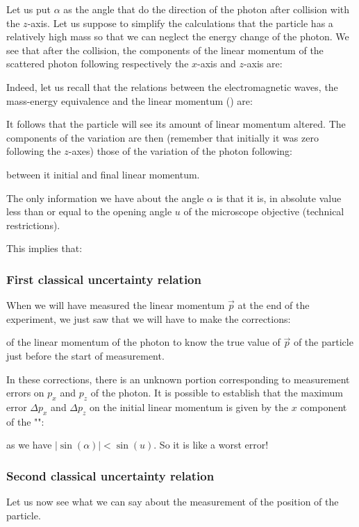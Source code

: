 	Let us put $\alpha$ as the angle that do the direction of the photon after collision with the $z$-axis. Let us suppose to simplify the calculations that the particle has a relatively high mass so that we can neglect the energy change of the photon. We see that after the collision, the components of the linear momentum of the scattered photon following respectively the $x$-axis and $z$-axis are:
	
	Indeed, let us recall that the relations between the electromagnetic waves, the mass-energy equivalence and the linear momentum () are:
	
	It follows that the particle will see its amount of linear momentum altered. The components of the variation are then (remember that initially it was zero following the $z$-axes) those of the variation of the photon following:
	
	between it initial and final linear momentum.

	The only information we have about the angle $\alpha$ is that it is, in absolute value less than or equal to the opening angle $u$ of the microscope objective (technical restrictions).

	This implies that:
	
	
	\subsubsection{First classical uncertainty relation}
	When we will have measured the linear momentum $\vec{p}$ at the end of the experiment, we just saw that we will have to make the corrections:
	
	of the linear momentum of the photon to know the true value of $\vec{p}$ of the particle just before the start of measurement.

	In these corrections, there is an unknown portion corresponding to measurement errors on $p_x$ and $p_z$ of the photon. It is possible to establish that the maximum error $\Delta p_x$ and $\Delta p_z$ on the initial linear momentum is given by the $x$ component of the "":
	
	as we have $|\sin(\alpha)|<\sin(u)$. So it is like a worst error!
	
	\subsubsection{Second classical uncertainty relation}
	Let us now see what we can say about the measurement of the position of the particle.

